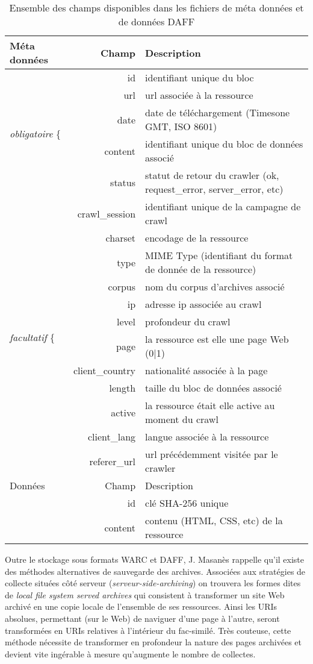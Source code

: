 \documentclass[symmetric,justified,marginals=raggedouter]{tufte-book}
\makeatletter
\newcommand{\vastt}{\bBigg@{4}}
\newcommand{\Vastt}{\bBigg@{11}}
\makeatother
\begin{document}
\begin{table*}
  \label{tab:daff}
  \begin{tabular}{lrl}
    \toprule
    Méta données& Champ & Description\\
    \midrule  
    \multirow{5}{*}{\emph{obligatoire} \vastt\{ }&id&identifiant unique du bloc\\
    &url&url associée à la ressource\\
    &date&date de téléchargement (Timesone GMT, ISO 8601)\\
    &content&identifiant unique du bloc de données associé\\     
    &status&statut de retour du crawler (ok, request\_error, server\_error, etc)\\
    \midrule     
    \multirow{12}{*}{\emph{facultatif   } \Vastt\{ }&crawl\_session&identifiant unique de la campagne de crawl\\
    &charset&encodage de la ressource\\
    &type&MIME Type (identifiant du format de donnée de la ressource)\\
    &corpus&nom du corpus d'archives associé\\
    &ip&adresse ip associée au crawl\\
    &level&profondeur du crawl\\
    &page&la ressource est elle une page Web (0|1)\\
    &client\_country&nationalité associée à la page\\
    &length&taille du bloc de données associé\\
	&active&la ressource était elle active au moment du crawl\\
	&client\_lang&langue associée à la ressource\\
	&referer\_url&url précédemment visitée par le crawler\\
    \midrule
    Données& Champ & Description\\
    \midrule 
    &id&clé SHA-256 unique\\
    &content&contenu (HTML, CSS, etc) de la ressource\\    	
    \bottomrule
\end{tabular}
  \bigskip
  \caption{Ensemble des champs disponibles dans les fichiers de méta données et de données DAFF}
\end{table*} 

\noindent Outre le stockage sous formats WARC et DAFF, J. Masanès \citep[p.64]{masanes_web_2006} rappelle qu'il existe des méthodes alternatives de sauvegarde des archives. Associées aux stratégies de collecte situées côté serveur (\textit{serveur-side-archiving}) on trouvera les formes dites de \textit{local file system served archives} qui consistent à transformer un site Web archivé en une copie locale de l'ensemble de ses ressources. Ainsi les URIs absolues, permettant (sur le Web) de naviguer d'une page à l'autre, seront transformées en URIs relatives à l'intérieur du fac-similé. Très couteuse, cette méthode nécessite de transformer en profondeur la nature des pages archivées et devient vite ingérable à mesure qu'augmente le nombre de collectes.
\end{document}
